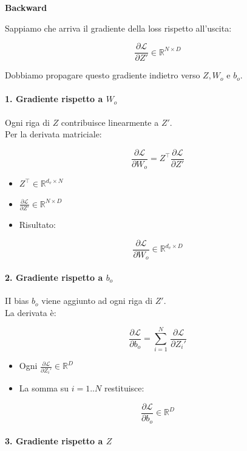 \documentclass[
  11pt,
]{article}
\begin{document}
\textbf{Backward}

Sappiamo che arriva il gradiente della loss rispetto
all'uscita:

\[\frac{\partial\mathcal{L}}{\partial Z'} \in \mathbb{R}^{N \times D}\]

Dobbiamo propagare questo gradiente indietro verso \(Z,W_{o}\) e
\(b_{o}\).

\paragraph{1. Gradiente rispetto a $W_o$}


Ogni riga di \(Z\) contribuisce linearmente a \(Z'\).\\
Per la derivata matriciale:

\[\frac{\partial\mathcal{L}}{\partial W_{o}} = Z^{\top}\frac{\partial\mathcal{L}}{\partial Z'}\]


\begin{itemize}
\item
  \(Z^{\top} \in \mathbb{R}^{d_v \times N}\)
\item
  \(\frac{\partial\mathcal{L}}{\partial Z'} \in \mathbb{R}^{N \times D}\)
\item
  Risultato:
\end{itemize}


\[\frac{\partial\mathcal{L}}{\partial W_{o}} \in \mathbb{R}^{d_v \times D}\]


\paragraph{2. Gradiente rispetto a $b_o$}


II bias \(b_{o}\) viene aggiunto ad ogni riga di \(Z'\).\\
La derivata è:

\[\frac{\partial\mathcal{L}}{\partial b_{o}} = \sum_{i = 1}^{N}\,\frac{\partial\mathcal{L}}{\partial Z_{i}'}\]


\begin{itemize}
\item
  Ogni
  \(\frac{\partial\mathcal{L}}{\partial Z_{i}'} \in \mathbb{R}^{D}\)
\item
  La somma su \(i = 1..N\) restituisce:
\end{itemize}


\[\frac{\partial\mathcal{L}}{\partial b_{o}} \in \mathbb{R}^{D}\]


\paragraph{3. Gradiente rispetto a $Z$}
\end{document}
